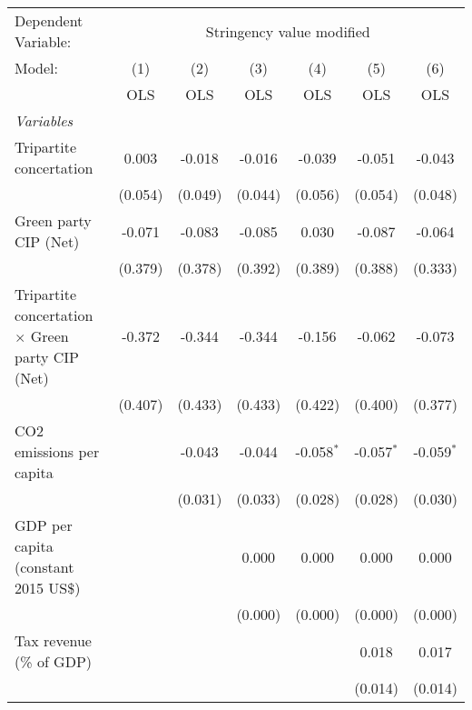 
\begingroup
\centering
\begin{tabular}{lcccccc}
   \toprule
   Dependent Variable: & \multicolumn{6}{c}{Stringency value modified}\\
   Model:                                                  & (1)     & (2)     & (3)     & (4)          & (5)          & (6)\\  
                                                           &  OLS    & OLS     & OLS     & OLS          & OLS          & OLS\\  
   \midrule
   \emph{Variables}\\
   Tripartite concertation                                 & 0.003   & -0.018  & -0.016  & -0.039       & -0.051       & -0.043\\   
                                                           & (0.054) & (0.049) & (0.044) & (0.056)      & (0.054)      & (0.048)\\   
   Green party CIP (Net)                                   & -0.071  & -0.083  & -0.085  & 0.030        & -0.087       & -0.064\\   
                                                           & (0.379) & (0.378) & (0.392) & (0.389)      & (0.388)      & (0.333)\\   
   Tripartite concertation $\times$ Green party CIP (Net)  & -0.372  & -0.344  & -0.344  & -0.156       & -0.062       & -0.073\\   
                                                           & (0.407) & (0.433) & (0.433) & (0.422)      & (0.400)      & (0.377)\\   
   CO2 emissions per capita                                &         & -0.043  & -0.044  & -0.058$^{*}$ & -0.057$^{*}$ & -0.059$^{*}$\\   
                                                           &         & (0.031) & (0.033) & (0.028)      & (0.028)      & (0.030)\\   
   GDP per capita (constant 2015 US\$)                     &         &         & 0.000   & 0.000        & 0.000        & 0.000\\   
                                                           &         &         & (0.000) & (0.000)      & (0.000)      & (0.000)\\   
   Tax revenue (\% of GDP)                                 &         &         &         &              & 0.018        & 0.017\\   
                                                           &         &         &         &              & (0.014)      & (0.014)\\   

\end{tabular}
